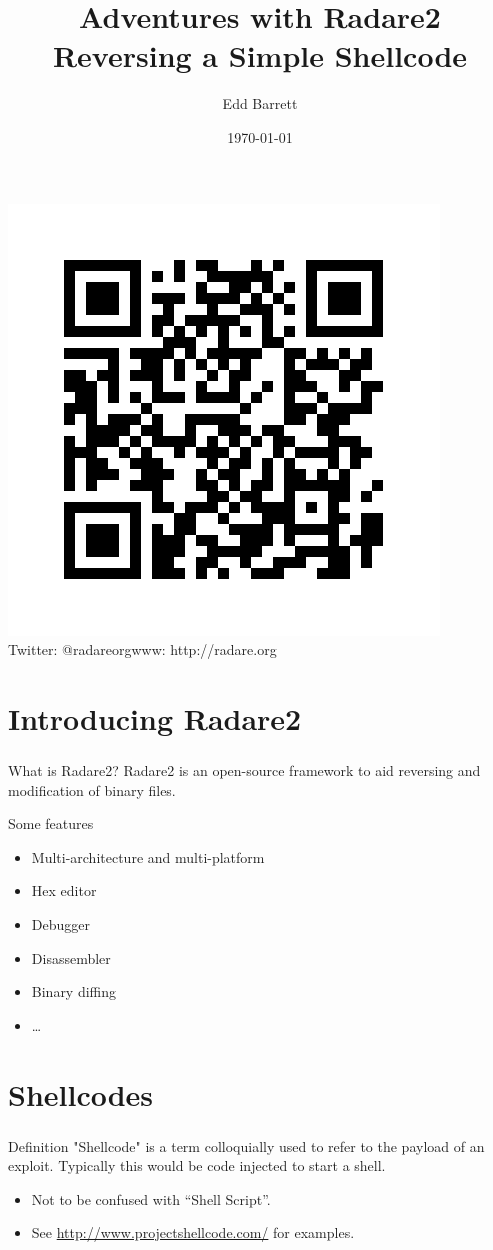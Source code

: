 \documentclass{beamer}
\title{Adventures with Radare2\\Reversing a Simple Shellcode}
\author{Edd Barrett}
\date{\today}
\begin{document}
\begin{frame}
  \titlepage
  \vspace{-2em}
  \begin{center}
  \includegraphics[origin=c,width=.25\textwidth]{qr.png}\\
  Twitter: @radareorg\hfill www: http://radare.org
  \end{center}
\end{frame}

\section{Introducing Radare2}

\begin{frame}[fragile]
\frametitle{\insertsection}

\begin{block}{What is Radare2?}
Radare2 is an open-source framework to aid reversing and modification of binary files.
\end{block}

\vfill

\begin{block}{Some features}
\begin{itemize}
\item Multi-architecture and multi-platform
\item Hex editor
\item Debugger
\item Disassembler
\item Binary diffing
\item \ldots
\end{itemize}
\end{block}

\end{frame}

\section{Shellcodes}
\begin{frame}
  \frametitle{\insertsection}

  \begin{block}{Definition}
  "Shellcode" is a term colloquially used to refer to the payload of an
  exploit. Typically this would be code injected to start a shell.    
  \end{block}

  \vfill

  \begin{itemize}
    \item Not to be confused with ``Shell Script''.
    \vfill
    \item See \url{http://www.projectshellcode.com/} for examples.
  \end{itemize}
\end{frame}
\end{document}
